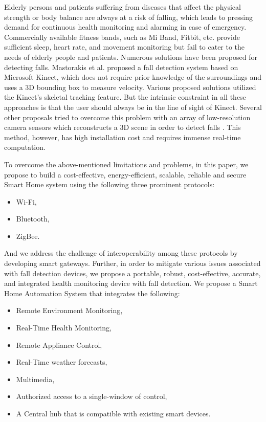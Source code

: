 Elderly persons and patients suffering from diseases that affect the physical strength or body balance are always at a risk of falling, which leads to pressing demand for continuous health monitoring and alarming in case of emergency. Commercially available fitness bands, such as Mi Band, Fitbit, etc. provide sufficient sleep, heart rate, and movement monitoring but fail to cater to the needs of elderly people and patients. Numerous solutions have been proposed for detecting falls. Mastorakis et al. \cite{9} proposed a fall detection system based on Microsoft Kinect, which does not require prior knowledge of the surroundings and uses a 3D bounding box to measure velocity. Various proposed solutions \cite{10,11} utilized the Kinect's skeletal tracking feature. But the intrinsic constraint in all these approaches is that the user should always be in the line of sight of Kinect. Several other proposals tried to overcome this problem with an array of low-resolution camera sensors which reconstructs a 3D scene in order to detect falls \cite{12,13}. This method, however, has high installation cost and requires immense real-time computation.

To overcome the above-mentioned limitations and problems, in this paper, we propose to build a cost-effective, energy-efficient, scalable, reliable and secure Smart Home system using the following three prominent protocols:
\begin{itemize}
  \item Wi-Fi,
  \item Bluetooth,
  \item ZigBee.
\end{itemize}
And we address the challenge of interoperability among these protocols by developing smart gateways. Further, in order to mitigate various issues associated with fall detection devices, we propose a portable, robust, cost-effective, accurate, and integrated health monitoring device with fall detection. We propose a Smart Home Automation System that integrates the following:
  \begin{itemize}
  \item Remote Environment Monitoring,
  \item Real-Time Health Monitoring,
  \item Remote Appliance Control,
  \item Real-Time weather forecasts,
  \item Multimedia,
  \item Authorized access to a single-window of control,
  \item A Central hub that is compatible with existing smart devices.
  \end{itemize}
  
